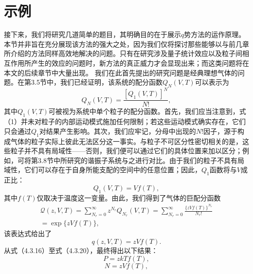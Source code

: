 \section{示例}\label{ux793aux4f8b}
接下来，我们将研究几道简单的题目，其明确目的在于展示\(q\)势方法的运作原理。本节并非旨在充分展现该方法的强大之处，因为我们仅将探讨那些能够以与前几章所介绍的方法同样高效地解决的问题。只有在研究涉及量子统计效应以及粒子间相互作用所产生的效应的问题时，新方法的真正威力才会显现出来；而这类问题将在本文的后续章节中大量出现。
我们在此首先提出的研究问题是经典理想气体的问题。在第3.5节中，我们已经证明，该系统的配分函数\(Q_{N}(V,T)\)可以表示为
\begin{equation}\tag{4.4.1}\label{eq:4.4.1}
Q _ { N } ( V , T ) = \frac { [ Q _ { 1 } ( V , T ) ] ^{N} } { N ! } ,
\end{equation}
其中\(Q_{1}(V,T)\)可被视为系统中单个粒子的配分函数。首先，我们应当注意到，式（1）并未对粒子的内部运动模式施加任何限制；若这些运动模式确实存在，它们只会通过\(Q_{1}\)对结果产生影响。其次，我们应牢记，分母中出现的\(N!\)因子，源于构成气体的粒子实际上彼此无法区分这一事实。与粒子不可区分性密切相关的是，这些粒子并不具有局域性——否则，我们便可以通过它们的具体位置来加以区分；例如，可将第3.8节中所研究的谐振子系统与之进行对比。由于我们的粒子不具有局域性，它们可以存在于自身所能支配的空间中的任意位置；因此，\(Q_{1}\)函数将与\(V\)成正比：
\begin{equation}\tag{4.4.2}\label{eq:4.4.2}
Q _ { 1 } ( V , T ) = V f ( T ) ,
\end{equation}
其中\(f(T)\)仅取决于温度这一变量。由此，我们得到了气体的巨配分函数
\begin{equation}\tag{4.4.3}\label{eq:4.4.3}
\begin{array}{r} { \mathcal { Q } ( z , V , T ) = \displaystyle \sum _ { N _ { r } = 0 } ^{\infty} z ^{N _ { r} } Q _ { N _ { r } } ( V , T ) = \displaystyle \sum _ { N _ { r } = 0 } ^{\infty} \frac { \{ z V f ( T ) \} ^{N _ { r} } } { N _ { r } ! } } \\{ = \exp \{ z V f ( T ) \} , } \end{array}
\end{equation}
该表达式给出了
\begin{equation}\tag{4.4.4}\label{eq:4.4.4}
q ( z , V , T ) = z V f ( T ) .
\end{equation}
从式（4.3.16）至式（4.3.20），最终得出以下结果：
\begin{equation}\tag{4.4.5}\label{eq:4.4.5}
P = z k T f ( T ) ,
\end{equation}
\begin{equation}\tag{4.4.6}\label{eq:4.4.6}
N = z V f ( T ) ,
\end{equation}
